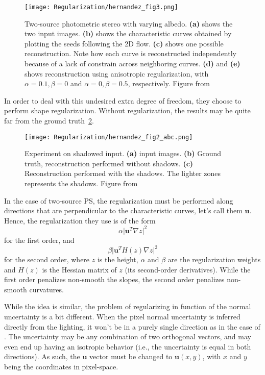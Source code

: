 \begin{figure}
\centering
\texttt{[image: Regularization/hernandez\_fig3.png]}
\caption{Two-source photometric stereo with varying albedo. \textbf{(a)} shows the two input images. \textbf{(b)} shows the characteristic curves obtained by plotting the seeds following the 2D flow. \textbf{(c)} shows one possible reconstruction. Note how each curve is reconstructed independently because of a lack of constrain across neighboring curves. \textbf{(d)} and \textbf{(e)} shows reconstruction using anisotropic regularization, with $\alpha = 0.1, \beta = 0$ and $\alpha = 0, \beta = 0.5$, respectively. Figure from~\cite{hernandez-pami-11}}
\label{fig:reg-her3}
\end{figure}

In order to deal with this undesired extra degree of freedom, they choose to perform shape regularization. Without regularization, the results may be quite far from the ground truth~\ref{fig:reg-her2}. 

\begin{figure}
\centering
\texttt{[image: Regularization/hernandez\_fig2\_abc.png]}
\caption{Experiment on shadowed input. \textbf{(a)} input images. \textbf{(b)} Ground truth, reconstruction performed without shadows. \textbf{(c)} Reconstruction performed with the shadows. The lighter zones represents the shadows. Figure from~\cite{hernandez-pami-11}}
\label{fig:reg-her2}
\end{figure}

In the case of two-source PS, the regularization must be performed along directions that are perpendicular to the characteristic curves, let's call them $\mathbf{u}$. Hence, the regularization they use is of the form
\begin{equation}
\alpha \lvert \mathbf{u}^T \nabla z \rvert ^2
\end{equation}
for the first order, and 
\begin{equation}
\beta \lvert \mathbf{u}^T H(z)\nabla z \rvert ^2
\end{equation}
for the second order, where $z$ is the height, $\alpha$ and $\beta$ are the regularization weights and $H(z)$ is the Hessian matrix of $z$ (its second-order derivatives). While the first order penalizes non-smooth the slopes, the second order penalizes non-smooth curvatures.

While the idea is similar, the problem of regularizing in function of the normal uncertainty is a bit different. When the pixel normal uncertainty is inferred directly from the lighting, it won't be in a purely single direction as in the case of \cite{hernandez-pami-11}. The uncertainty may be any combination of two orthogonal vectors, and may even end up having an isotropic behavior (i.e., the uncertainty is equal in both directions). As such, the $\mathbf{u}$ vector must be changed to $\mathbf{u}(x,y)$, with $x$ and $y$ being the coordinates in pixel-space.

